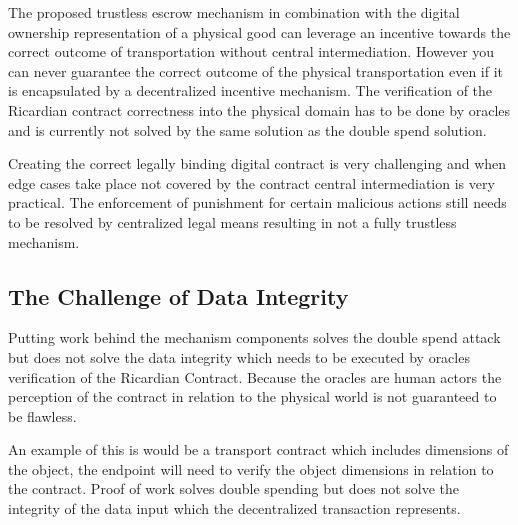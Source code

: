 
The proposed trustless escrow mechanism in combination with the digital ownership representation of a physical good can leverage an incentive towards the correct outcome of transportation without central intermediation. However you can never guarantee the correct outcome of the physical transportation even if it is encapsulated by a decentralized incentive mechanism. The verification of the Ricardian contract correctness into the physical domain has to be done by oracles and is currently not solved by the same solution as the double spend solution.\par
Creating the correct legally binding digital contract is very challenging and when edge cases take place not covered by the contract central intermediation is very practical. The enforcement of punishment for certain malicious actions still needs to be resolved by centralized legal means resulting in not a fully trustless mechanism. \par

\subsection{The Challenge of Data Integrity}

Putting work behind the mechanism components solves the double spend attack but does not solve the data integrity which needs to be executed by oracles verification of the Ricardian Contract. Because the oracles are human actors the perception of the contract in relation to the physical world is not guaranteed to be flawless. \par
An example of this is would be a transport contract which includes dimensions of the object, the endpoint will need to verify the object dimensions in relation to the contract. Proof of work solves double spending but does not solve the integrity of the data input which the decentralized transaction represents.

